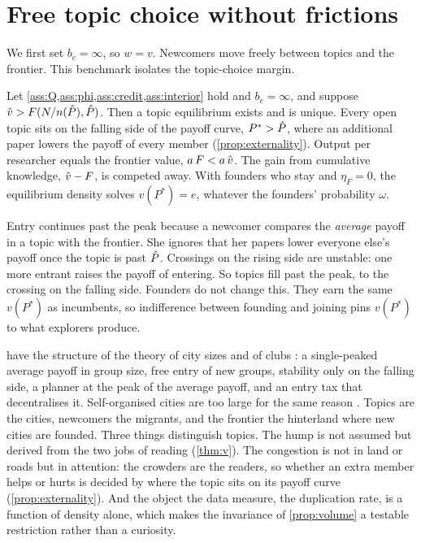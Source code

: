 \section{Free topic choice without frictions}\label{sec:frictionless}

We first set $b_c=\infty$, so $w=v$. Newcomers move freely between topics and
the frontier. This benchmark isolates the topic-choice margin.

\begin{proposition}\label{prop:eq}
Let \cref{ass:Q,ass:phi,ass:credit,ass:interior} hold and $b_c=\infty$, and
suppose $\hat v>F(N/n(\hat P),\hat P)$. Then a topic equilibrium exists and is
unique. Every open topic sits on the falling side of the payoff curve,
$P^*>\hat P$, where an additional paper lowers the payoff of every member
(\cref{prop:externality}). Output per researcher equals the frontier value,
$a\,F<a\,\hat v$. The gain from cumulative knowledge, $\hat v-F$, is competed away.
With founders who stay and $\eta_F=0$, the equilibrium density solves
$v(P^*)=e$, whatever the founders' probability $\omega$.
\end{proposition}

Entry continues past the peak because a newcomer compares the \emph{average}
payoff in a topic with the frontier. She ignores that her papers lower everyone
else's payoff once the topic is past $\hat P$. Crossings on the rising side are
unstable: one more entrant raises the payoff of entering. So topics fill past
the peak, to the crossing on the falling side. Founders do not change this.
They earn the same $v(P^*)$ as incumbents, so indifference between founding and
joining pins $v(P^*)$ to what explorers produce.

\begin{remark}\label{rem:henderson}
 have the structure of the theory of city sizes
\citep{henderson1974} and of clubs \citep{buchanan1965,scotchmer2002}: a single-peaked
average payoff in group size, free entry of new groups, stability only on the
falling side, a planner at the peak of the average payoff, and an entry tax
that decentralises it. Self-organised cities are too large for the same
reason \citep{hendersonbecker2000}. Topics are the cities, newcomers the
migrants, and the frontier the hinterland where new cities are founded. Three
things distinguish topics. The hump is not assumed but derived from the two
jobs of reading (\cref{thm:v}). The congestion is not in land or roads but in
attention: the crowders are the readers, so whether an extra member helps or
hurts is decided by where the topic sits on its payoff curve
(\cref{prop:externality}). And the object the data measure, the duplication rate,
is a function of density alone, which makes the invariance of
\cref{prop:volume} a testable restriction rather than a curiosity.
\end{remark}

